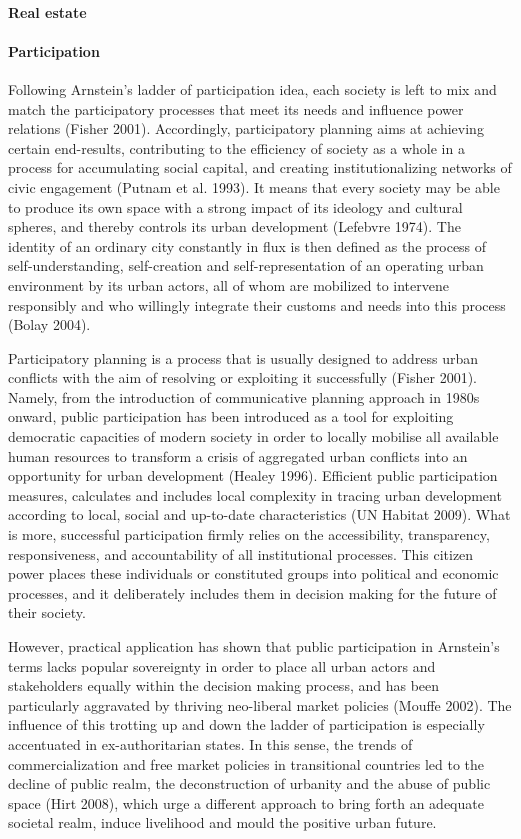 \documentclass[11pt]{report}
\begin{document}
\paragraph{Real estate}
\paragraph{Participation}
Following Arnstein’s ladder of participation idea, each society is left to mix and match the participatory processes that meet its needs and influence power relations (Fisher 2001). Accordingly, participatory planning aims at achieving certain end-results, contributing to the efficiency of society as a whole in a process for accumulating social capital, and creating institutionalizing networks of civic engagement (Putnam et al. 1993). It means that every society may be able to produce its own space with a strong impact of its ideology and cultural spheres, and thereby controls its urban development (Lefebvre 1974). The identity of an ordinary city constantly in flux is then defined as the process of self-understanding, self-creation and self-representation of an operating urban environment by its urban actors, all of whom are mobilized to intervene responsibly and who willingly integrate their customs and needs into this process (Bolay 2004).

Participatory planning is a process that is usually designed to address urban conflicts with the aim of resolving or exploiting it successfully (Fisher 2001). Namely, from the introduction of communicative planning approach in 1980s onward, public participation has been introduced as a tool for exploiting democratic capacities of modern society in order to locally mobilise all available human resources to transform a crisis of aggregated urban conflicts into an opportunity for urban development (Healey 1996). Efficient public participation measures, calculates and includes local complexity in tracing urban development according to local, social and up-to-date characteristics (UN Habitat 2009). What is more, successful participation firmly relies on the accessibility, transparency, responsiveness, and accountability of all institutional processes. This citizen power places these individuals or constituted groups into political and economic processes, and it deliberately includes them in decision making for the future of their society.

However, practical application has shown that public participation in Arnstein’s terms lacks popular sovereignty in order to place all urban actors and stakeholders equally within the decision making process, and has been particularly aggravated by thriving neo-liberal market policies (Mouffe 2002). The influence of this trotting up and down the ladder of participation is especially accentuated in ex-authoritarian states. In this sense, the trends of commercialization and free market policies in transitional countries led to the decline of public realm, the deconstruction of urbanity and the abuse of public space (Hirt 2008), which urge a different approach to bring forth an adequate societal realm, induce livelihood and mould the positive urban future.
\end{document}
